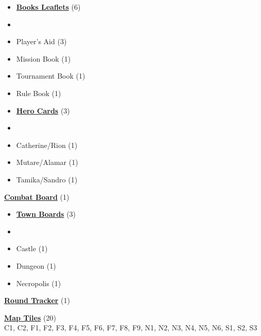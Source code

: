 

\begin{multicols*}{3}

\footnotesize

\begin{itemize}[leftmargin=0pt, label={}, noitemsep]
  \item \textbf{\small{\underline{Books Leaflets}}} (6)
  \item
  \item Player's Aid (3)
  \item Mission Book (1)
  \item Tournament Book (1)
  \item Rule Book (1)
\end{itemize}

\begin{itemize}[leftmargin=0pt, label={}, noitemsep]
  \item \textbf{\small{\underline{Hero Cards}}} (3)
  \item
  \item Catherine/Rion (1)
  \item Mutare/Alamar (1)
  \item Tamika/Sandro (1)
\end{itemize}

\textbf{\small{\underline{Combat Board}}} (1)

\begin{itemize}[leftmargin=0pt, label={}, noitemsep]
  \item \textbf{\small{\underline{Town Boards}}} (3)
  \item
  \item Castle (1)
  \item Dungeon (1)
  \item Necropolis (1)
\end{itemize}

\textbf{\small{\underline{Round Tracker}}} (1)

\textbf{\small{\underline{Map Tiles}}} (20)\\

C1, C2, F1, F2, F3, F4, F5, F6, F7, F8, F9, N1, N2, N3, N4, N5, N6, S1, S2, S3


\end{multicols*}
